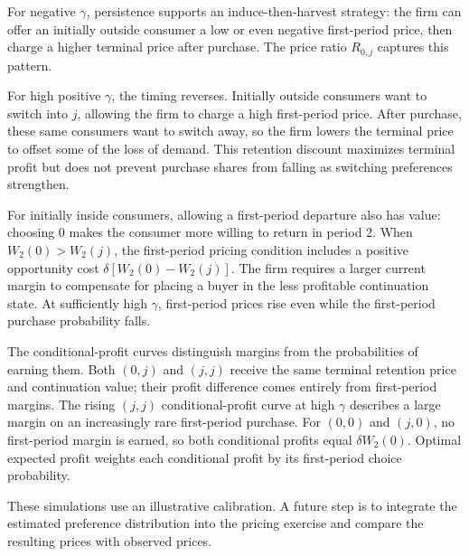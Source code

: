 \documentclass[11pt]{article}
\begin{document}
For negative $\gamma$, persistence supports an induce-then-harvest strategy:
the firm can offer an initially outside consumer a low or even negative
first-period price, then charge a higher terminal price after purchase.
The price ratio $R_{0,j}$ captures this pattern.

For high positive $\gamma$, the timing reverses. Initially outside consumers
want to switch into $j$, allowing the firm to charge a high first-period
price. After purchase, these same consumers want to switch away, so the firm
lowers the terminal price to offset some of the loss of demand. This retention
discount maximizes terminal profit but does not prevent purchase shares from
falling as switching preferences strengthen.

For initially inside consumers, allowing a first-period departure also has
value: choosing $0$ makes the consumer more willing to return in period 2.
When $W_2(0)>W_2(j)$, the first-period pricing condition includes a positive
opportunity cost $\delta[W_2(0)-W_2(j)]$. The firm requires a larger current
margin to compensate for placing a buyer in the less profitable continuation
state. At sufficiently high $\gamma$, first-period prices rise even while the
first-period purchase probability falls.

The conditional-profit curves distinguish margins from the probabilities of
earning them. Both $(0,j)$ and $(j,j)$ receive the same terminal retention
price and continuation value; their profit difference comes entirely from
first-period margins. The rising $(j,j)$ conditional-profit curve at high
$\gamma$ describes a large margin on an increasingly rare first-period
purchase. For $(0,0)$ and $(j,0)$, no first-period margin is earned, so both
conditional profits equal $\delta W_2(0)$. Optimal expected profit weights
each conditional profit by its first-period choice probability.

These simulations use an illustrative calibration. A future step is to
integrate the estimated preference distribution into the pricing exercise
and compare the resulting prices with observed prices.
\end{document}
